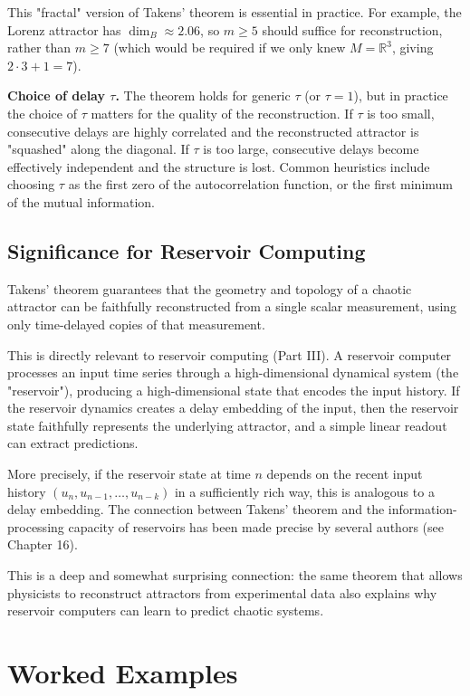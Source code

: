 This "fractal" version of Takens' theorem is essential in practice. For example, the Lorenz attractor has $\dim_B \approx 2.06$, so $m \geq 5$ should suffice for reconstruction, rather than $m \geq 7$ (which would be required if we only knew $M = \mathbb{R}^3$, giving $2 \cdot 3 + 1 = 7$).

\textbf{Choice of delay $\tau$.} The theorem holds for generic $\tau$ (or $\tau = 1$), but in practice the choice of $\tau$ matters for the quality of the reconstruction. If $\tau$ is too small, consecutive delays are highly correlated and the reconstructed attractor is "squashed" along the diagonal. If $\tau$ is too large, consecutive delays become effectively independent and the structure is lost. Common heuristics include choosing $\tau$ as the first zero of the autocorrelation function, or the first minimum of the mutual information.

\subsection{Significance for Reservoir Computing}\label{sec:6.7.4}

Takens' theorem guarantees that the geometry and topology of a chaotic attractor can be faithfully reconstructed from a single scalar measurement, using only time-delayed copies of that measurement.

This is directly relevant to reservoir computing (Part III). A reservoir computer processes an input time series through a high-dimensional dynamical system (the "reservoir"), producing a high-dimensional state that encodes the input history. If the reservoir dynamics creates a delay embedding of the input, then the reservoir state faithfully represents the underlying attractor, and a simple linear readout can extract predictions.

More precisely, if the reservoir state at time $n$ depends on the recent input history $(u_n, u_{n-1}, \ldots, u_{n-k})$ in a sufficiently rich way, this is analogous to a delay embedding. The connection between Takens' theorem and the information-processing capacity of reservoirs has been made precise by several authors (see Chapter 16).

This is a deep and somewhat surprising connection: the same theorem that allows physicists to reconstruct attractors from experimental data also explains why reservoir computers can learn to predict chaotic systems.


\bigskip


\section{Worked Examples}\label{sec:6.8}

